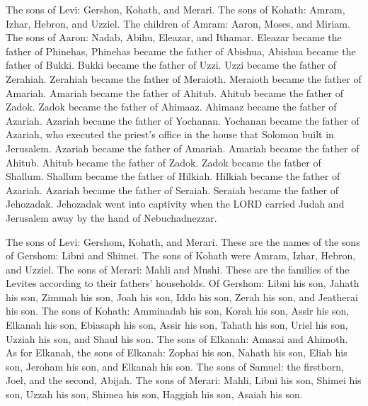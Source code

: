 \mychapter{} \myverse*{}The sons of Levi: Gershon, Kohath, and Merari.
\myverse{}The sons of Kohath: Amram, Izhar, Hebron, and Uzziel.
\myverse{}The children of Amram: Aaron, Moses, and Miriam. The sons of Aaron: Nadab, Abihu,
Eleazar, and Ithamar.
\myverse{}Eleazar became the father of Phinehas, Phinehas became the father of Abishua,
\myverse{}Abishua became the father of Bukki. Bukki became the father of Uzzi.
\myverse{}Uzzi became the father of Zerahiah. Zerahiah became the father of Meraioth.
\myverse{}Meraioth became the father of Amariah. Amariah became the father of Ahitub.
\myverse{}Ahitub became the father of Zadok. Zadok became the father of Ahimaaz.
\myverse{}Ahimaaz became the father of Azariah. Azariah became the father of Yochanan.
\myverse{}Yochanan became the father of Azariah, who executed the priest’s office in
the house that Solomon built in Jerusalem.
\myverse{}Azariah became the father of Amariah. Amariah became the father of Ahitub.
\myverse{}Ahitub became the father of Zadok. Zadok became the father of Shallum.
\myverse{}Shallum became the father of Hilkiah. Hilkiah became the father of Azariah.
\myverse{}Azariah became the father of Seraiah. Seraiah became the father of Jehozadak.
\myverse{}Jehozadak went into captivity when the LORD carried Judah and Jerusalem away
by the hand of Nebuchadnezzar.

\myverse{}The sons of Levi: Gershom, Kohath, and Merari.
\myverse{}These are the names of the sons of Gershom: Libni and Shimei.
\myverse{}The sons of Kohath were Amram, Izhar, Hebron, and Uzziel.
\myverse{}The sons of Merari: Mahli and Mushi. These are the families of the Levites
according to their fathers’ households.
\myverse{}Of Gershom: Libni his son, Jahath his son, Zimmah his son,
\myverse{}Joah his son, Iddo his son, Zerah his son, and Jeatherai his son.
\myverse{}The sons of Kohath: Amminadab his son, Korah his son, Assir his son,
\myverse{}Elkanah his son, Ebiasaph his son, Assir his son,
\myverse{}Tahath his son, Uriel his son, Uzziah his son, and Shaul his son.
\myverse{}The sons of Elkanah: Amasai and Ahimoth.
\myverse{}As for Elkanah, the sons of Elkanah: Zophai his son, Nahath his son,
\myverse{}Eliab his son, Jeroham his son, and Elkanah his son.
\myverse{}The sons of Samuel: the firstborn, Joel, and the second, Abijah.
\myverse{}The sons of Merari: Mahli, Libni his son, Shimei his son, Uzzah his son,
\myverse{}Shimea his son, Haggiah his son, Asaiah his son.

